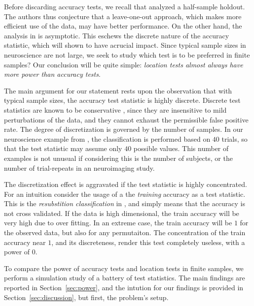 \documentclass[12pt,a4paper]{article}
\begin{document}
Before discarding accuracy tests, we recall that \cite{ramdas_classification_2016} analyzed a half-sample holdout. 
The authors thus conjecture that a leave-one-out approach, which makes more efficient use of the data, may have better performance. 
On the other hand, the analysis in \cite{ramdas_classification_2016} is asymptotic. This eschews the discrete nature of the accuracy statistic, which will shown to have  acrucial impact. 
Since typical sample sizes in neuroscience are not large, we seek to study which test is to be preferred in finite samples? 
Our conclusion will be quite simple: {\em location tests almost always have more power than accuracy tests}.

The main argument for our statement rests upon the observation that with typical sample sizes, the accuracy test statistic is highly discrete. 
Discrete test statistics are known to be conservative \citep{hemerik_exact_2014}, since they are insensitive to mild perturbations of the data, and they cannot exhaust the permissible false positive rate. 
The degree of discretization is governed by the number of samples. 
In our neuroscience example from \citep{gilron_quantifying_2016}, the classification is performed based on $40$ trials, so that the test statistic may assume only $40$ possible values. 
This number of examples is not unusual if considering this is the number of subjects, or the number of trial-repeats in an neuroimaging study. 

The discretization effect is aggravated if the test statistic is highly concentrated. 
For an intuition consider the usage of a the \emph{training} accuracy as a test statistic.
This is the \emph{resubstition classification} in \cite{ramdas_classification_2016}, and simply means that the accuracy is not cross validated. 
If the data is high dimensional, the train accuracy will be very high due to over fitting. 
In an extreme case, the train accuracy will be $1$ for the observed data, but also for any permutaiton. 
The concentration of the train accuracy near $1$, and its discreteness, render this test completely useless, with a power of $0$. 


To compare the power of accuracy tests and location tests in finite samples, we perform a simulation study of a battery of test statistics. 
The main findings are reported in Section~\ref{sec:power}, and the intution for our findings is provided in Section~\ref{sec:discussion}, but first, the problem's setup. 
\end{document}
